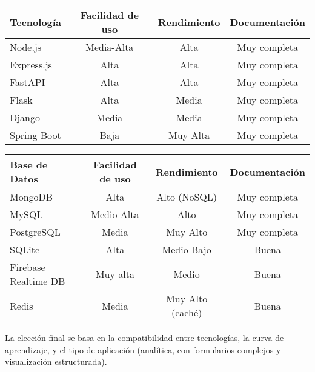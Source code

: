 \begin{center}
\begin{tabular}{|l|c|c|c|}
\hline
\textbf{Tecnología} & \textbf{Facilidad de uso} & \textbf{Rendimiento} & \textbf{Documentación} \\
\hline
Node.js & Media-Alta & Alta & Muy completa \\
Express.js & Alta & Alta & Muy completa \\
FastAPI & Alta & Alta & Muy completa \\
Flask & Alta & Media & Muy completa \\
Django & Media & Media & Muy completa \\
Spring Boot & Baja & Muy Alta & Muy completa \\
\hline
\end{tabular}
\end{center}

\begin{center}
\begin{tabular}{|l|c|c|c|}
\hline
\textbf{Base de Datos} & \textbf{Facilidad de uso} & \textbf{Rendimiento} & \textbf{Documentación} \\
\hline
MongoDB & Alta & Alto (NoSQL) & Muy completa \\
MySQL & Medio-Alta & Alto & Muy completa \\
PostgreSQL & Media & Muy Alto & Muy completa \\
SQLite & Alta & Medio-Bajo & Buena \\
Firebase Realtime DB & Muy alta & Medio & Buena \\
Redis & Media & Muy Alto (caché) & Buena \\
\hline
\end{tabular}
\end{center}

La elección final se basa en la compatibilidad entre tecnologías, la curva de aprendizaje, y el tipo de aplicación (analítica, con formularios complejos y visualización estructurada).

